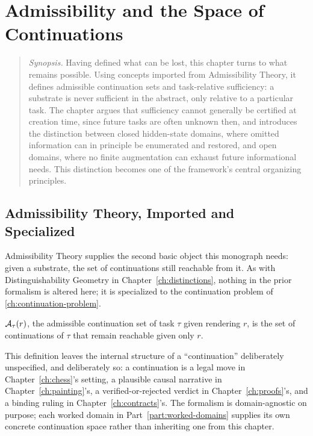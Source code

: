 \chapter{Admissibility and the Space of Continuations}
\label{ch:admissibility}

\begin{quotation}
\noindent\textit{Synopsis.} Having defined what can be lost, this chapter
turns to what remains possible. Using concepts imported from Admissibility
Theory, it defines admissible continuation sets and task-relative
sufficiency: a substrate is never sufficient in the abstract, only relative
to a particular task. The chapter argues that sufficiency cannot generally
be certified at creation time, since future tasks are often unknown then,
and introduces the distinction between closed hidden-state domains, where
omitted information can in principle be enumerated and restored, and open
domains, where no finite augmentation can exhaust future informational
needs. This distinction becomes one of the framework's central organizing
principles.
\end{quotation}

\section{Admissibility Theory, Imported and Specialized}

Admissibility Theory supplies the second basic object this monograph
needs: given a substrate, the set of continuations still reachable from
it. As with Distinguishability Geometry in Chapter~\ref{ch:distinctions},
nothing in the prior formalism is altered here; it is specialized to the
continuation problem of \cref{ch:continuation-problem}.

\begin{definition}
\label{def:admissible-set}
$\mathcal{A}_{\tau}(r)$, the admissible continuation set of task $\tau$ given
rendering $r$, is the set of continuations of $\tau$ that remain reachable
given only $r$.
\end{definition}

This definition leaves the internal structure of a ``continuation''
deliberately unspecified, and deliberately so: a continuation is a legal
move in Chapter~\ref{ch:chess}'s setting, a plausible causal narrative in
Chapter~\ref{ch:painting}'s, a verified-or-rejected verdict in
Chapter~\ref{ch:proofs}'s, and a binding ruling in
Chapter~\ref{ch:contracts}'s. The formalism is domain-agnostic on purpose;
each worked domain in Part~\ref{part:worked-domains} supplies its own
concrete continuation space rather than inheriting one from this chapter.

